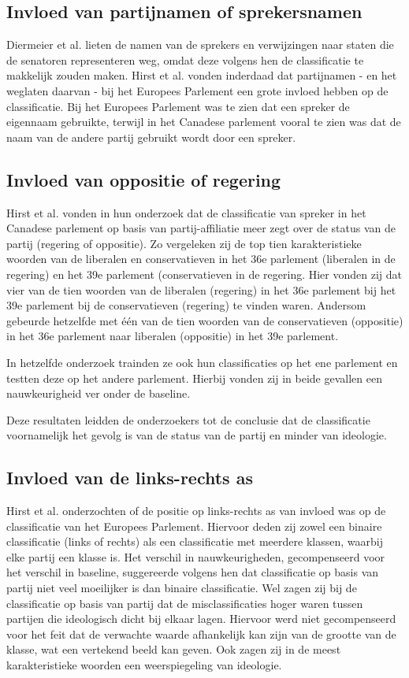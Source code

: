 \subsection{Invloed van partijnamen of sprekersnamen}
Diermeier et al. \cite{diermeier_godbout_yu_kaufmann_2012} lieten de namen van de sprekers en verwijzingen naar staten die de senatoren representeren weg, omdat deze volgens hen de classificatie te makkelijk zouden maken. Hirst et al. \cite{Hirst_textto} vonden inderdaad dat partijnamen - en het weglaten daarvan - bij het Europees Parlement een grote invloed hebben op de classificatie. Bij het Europees Parlement was te zien dat een spreker de eigennaam gebruikte, terwijl in het Canadese parlement vooral te zien was dat de naam van de andere partij gebruikt wordt door een spreker.

\subsection{Invloed van oppositie of regering}
Hirst et al. \cite{Hirst_textto} vonden in hun onderzoek dat de classificatie van spreker in het Canadese parlement op basis van partij-affiliatie meer zegt over de status van de partij (regering of oppositie). Zo vergeleken zij de top tien karakteristieke woorden van de liberalen en conservatieven in het 36e parlement (liberalen in de regering) en het 39e parlement (conservatieven in de regering. Hier vonden zij dat vier van de tien woorden van de liberalen (regering) in het 36e parlement bij het 39e parlement bij de conservatieven (regering) te vinden waren. Andersom gebeurde hetzelfde met één van de tien woorden van de conservatieven (oppositie) in het 36e parlement naar liberalen (oppositie) in het 39e parlement.\par
In hetzelfde onderzoek trainden ze ook hun classificaties op het ene parlement en testten deze op het andere parlement. Hierbij vonden zij in beide gevallen een nauwkeurigheid ver onder de baseline. \par
Deze resultaten leidden de onderzoekers tot de conclusie dat de classificatie voornamelijk het gevolg is van de status van de partij en minder van ideologie.\par

\subsection{Invloed van de links-rechts as}
Hirst et al. \cite{Hirst_textto} onderzochten of de positie op links-rechts as van invloed was op de classificatie van het Europees Parlement. Hiervoor deden zij zowel een binaire classificatie (links of rechts) als een classificatie met meerdere klassen, waarbij elke partij een klasse is. Het verschil in nauwkeurigheden, gecompenseerd voor het verschil in baseline, suggereerde volgens hen dat classificatie op basis van partij niet veel moeilijker is dan binaire classificatie. Wel zagen zij bij de classificatie op basis van partij dat de misclassificaties hoger waren tussen partijen die ideologisch dicht bij elkaar lagen. Hiervoor werd niet gecompenseerd voor het feit dat de verwachte waarde afhankelijk kan zijn van de grootte van de klasse, wat een vertekend beeld kan geven. Ook zagen zij in de meest karakteristieke woorden een weerspiegeling van ideologie.